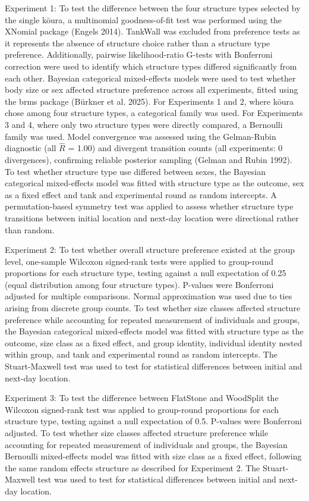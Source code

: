 \documentclass[
  12pt,
  a4paper,
]{scrbook}
\begin{document}
Experiment 1: To test the difference between the four structure types
selected by the single kōura, a multinomial goodness-of-fit test was
performed using the XNomial package (Engels 2014). TankWall was excluded
from preference tests as it represents the absence of structure choice
rather than a structure type preference. Additionally, pairwise
likelihood-ratio G-tests with Bonferroni correction were used to
identify which structure types differed significantly from each other.
Bayesian categorical mixed-effects models were used to test whether body
size or sex affected structure preference across all experiments, fitted
using the brms package (Bürkner et al. 2025). For Experiments 1 and 2,
where kōura chose among four structure types, a categorical family was
used. For Experiments 3 and 4, where only two structure types were
directly compared, a Bernoulli family was used. Model convergence was
assessed using the Gelman-Rubin diagnostic (all \(\hat{R}\) = 1.00) and
divergent transition counts (all experiments: 0 divergences), confirming
reliable posterior sampling (Gelman and Rubin 1992). To test whether
structure type use differed between sexes, the Bayesian categorical
mixed-effects model was fitted with structure type as the outcome, sex
as a fixed effect and tank and experimental round as random intercepts.
A permutation-based symmetry test was applied to assess whether
structure type transitions between initial location and next-day
location were directional rather than random.

Experiment 2: To test whether overall structure preference existed at
the group level, one-sample Wilcoxon signed-rank tests were applied to
group-round proportions for each structure type, testing against a null
expectation of 0.25 (equal distribution among four structure types).
P-values were Bonferroni adjusted for multiple comparisons. Normal
approximation was used due to ties arising from discrete group counts.
To test whether size classes affected structure preference while
accounting for repeated measurement of individuals and groups, the
Bayesian categorical mixed-effects model was fitted with structure type
as the outcome, size class as a fixed effect, and group identity,
individual identity nested within group, and tank and experimental round
as random intercepts. The Stuart-Maxwell test was used to test for
statistical differences between initial and next-day location.

Experiment 3: To test the difference between FlatStone and WoodSplit the
Wilcoxon signed-rank test was applied to group-round proportions for
each structure type, testing against a null expectation of 0.5. P-values
were Bonferroni adjusted. To test whether size classes affected
structure preference while accounting for repeated measurement of
individuals and groups, the Bayesian Bernoulli mixed-effects model was
fitted with size class as a fixed effect, following the same random
effects structure as described for Experiment 2. The Stuart-Maxwell test
was used to test for statistical differences between initial and
next-day location.
\end{document}
